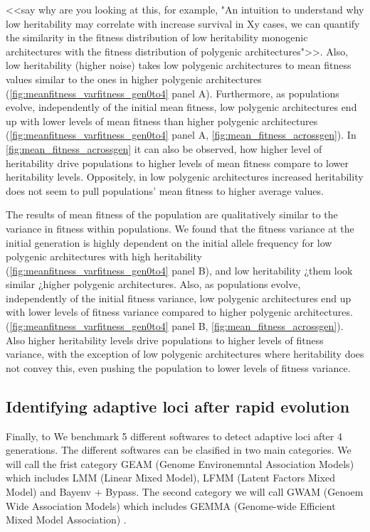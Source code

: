 \documentclass{article}
\begin{document}
<<say why are you looking at this, for example, "An intuition to understand why low heritability may correlate with increase survival in Xy cases, we can quantify the similarity in the fitness distribution of low heritability monogenic architectures with the fitness distribution of  polygenic architectures">>. Also, low heritability (higher noise) takes low polygenic architectures to mean fitness values similar to the ones in higher polygenic architectures (\ref{fig:meanfitness_varfitness_gen0to4} panel A). Furthermore, as populations evolve, independently of the initial mean fitness, low polygenic architectures end up with lower levels of mean fitness than higher polygenic architectures (\ref{fig:meanfitness_varfitness_gen0to4} panel A, \ref{fig:mean_fitness_acrossgen}). In \ref{fig:mean_fitness_acrossgen} it can also be observed, how higher level of heritability drive populations to higher levels of mean fitness compare to lower heritability levels. Oppositely, in low polygenic architectures increased heritability does not seem to pull populations' mean fitness to higher average values.

The results of mean fitness of the population are qualitatively similar to the variance in fitness within populations. We found that the fitness variance at the initial generation is highly dependent on the initial allele frequency for low polygenic architectures with high heritability (\ref{fig:meanfitness_varfitness_gen0to4} panel B), and low heritability ¿\making them look similar    
¿\to higher polygenic architectures. Also, as populations evolve, independently of the initial fitness variance, low polygenic architectures end up with lower levels of fitness variance compared to higher polygenic architectures. (\ref{fig:meanfitness_varfitness_gen0to4} panel B, \ref{fig:mean_fitness_acrossgen}). Also higher heritability levels drive populations to higher levels of fitness variance, with the exception of low polygenic architectures where heritability does not convey this, even pushing the population to lower levels of fitness variance.

\subsection{Identifying adaptive loci after rapid evolution}

Finally, to 
We benchmark 5 different softwares to detect adaptive loci after 4 generations. The different softwares can be clasified in two main categories. We will call the frist category GEAM (Genome Environemntal Association Models) which includes LMM (Linear Mixed Model), LFMM (Latent Factors Mixed Model) and Bayenv + Bypass. The second category we will call GWAM (Genoem Wide Association Models) which includes GEMMA (Genome-wide Efficient Mixed Model Association) \citep{Zhou2012-jb}. %
\end{document}
